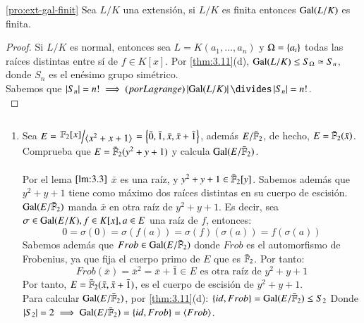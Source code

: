\begin{pro}\ref{pro:ext-gal-finit}
    Sea $L/K$ una extensión, si $L/K$ es finita entonces $\mathrm{Gal}(L/K)$ es finita.
\end{pro}

\begin{proof}
    Si $L/K$ es normal, entonces sea $L = K(a_1, \ldots, a_n)$ y $\Omega = \left\{a_i\right\}$ todas las raíces distintas entre sí de $f \in K[x]$. Por \ref{thm:3.11}(d), $\mathrm{Gal}(L/K) \leq S_\Omega \simeq S_n$, donde $S_n$ es el enésimo grupo simétrico.\\
    Sabemos que $\vabs{S_n} = n! \implies \text(por Lagrange) \vabs{\gal(L/K)} \divides \vabs{S_n} = n!$.\\
\end{proof}

\begin{eg}$ $
    \begin{enumerate}
        \item Sea $E = \quo{\F_2[x]}{\gen{x^2 + x + 1}} = \sdf{\bar 0, \bar 1, \bar x, \bar x + \bar 1}$, además $E/\bar {\mathbb{F}}_2$, de hecho, $E = \bar {\mathbb{F}}_2(\bar x)$. Comprueba que $E = \bar{\mathbb{F}}_2(y^2 + y + 1)$ y calcula $\mathrm{Gal}(E/\bar {\mathbb{F}}_2)$.\\\\

        Por el lema $\ref{lm:3.3}$ $\bar x$ es una raíz, y $y^2 + y + 1 \in \bar{\mathbb{F}}_2[y]$. Sabemos además que $y^2 + y + 1$ tiene como máximo dos raíces distintas en su cuerpo de escisión.\\
        $\mathrm{Gal}(E/\bar{\mathbb{F}}_2)$ manda $\bar x$ en otra raíz de $y^2 + y + 1$. Es decir, sea $\sigma \in \mathrm{Gal}(E/K), f\in K[x], a\in E$ una raíz de $f$, entonces:
        $$
            0 = \sigma(0) = \sigma(f(a)) = \sigma(f)(\sigma(a)) = f(\sigma(a))
        $$
        Sabemos además que $Frob \in \mathrm{Gal}(E/\bar {\mathbb{F}}_2)$ donde $Frob$ es el automorfismo de Frobenius, ya que fija el cuerpo primo de $E$ que es $\bar {\mathbb{F}}_2$. Por tanto:
        $$
            Frob(\bar x) = \bar x^2 = \bar x + \bar 1 \in E \text{ es otra raíz de } y^2 + y + 1
        $$
        Por tanto, $E = \bar {\mathbb{F}}_2(\bar x, \bar x + \bar 1)$, es el cuerpo de escisión de $y^2 + y + 1$.\\

        Para calcular $\mathrm{Gal}(E/\bar {\mathbb{F}}_2)$, por \ref{thm:3.11}(d): $\left\{id, Frob\right\} = \mathrm{Gal}(E/\bar {\mathbb{F}}_2) \leq S_2$ Donde $\left|S_2\right| = 2 \implies \mathrm{Gal}(E/\bar {\mathbb{F}}_2) = \left\{id, Frob\right\} = \langle Frob\rangle$.


\end{enumerate}
\end{eg}
